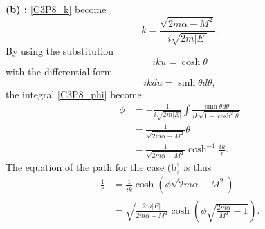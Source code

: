 \begin{problem}
{\vspace{4ex}\textbf{(b) :} \eqref{C3P8_k} become
\begin{equation*}
    k = \frac{\sqrt{2m\alpha-M^2}}{i\sqrt{2m|E|}}.
\end{equation*}
By using the substitution
\begin{equation*}
    iku = \cosh{\theta}
\end{equation*}
with the differential form
\begin{equation*}
    ikdu = \sinh{\theta}d\theta,
\end{equation*}
the integral \eqref{C3P8_phi} become
\begin{align*}
    \phi &= -\frac{1}{i\sqrt{2m|E|}} \int \frac{\sinh{\theta}d\theta}{ik\sqrt{1 - \cosh^2{\theta}}} \\
    &= \frac{1}{\sqrt{2m\alpha-M^2}} \theta \\
    &= \frac{1}{\sqrt{2m\alpha-M^2}} \cosh^{-1}{\frac{ik}{r}}.
\end{align*}
The equation of the path for the case (b) is thus
\begin{align*}
    \frac{1}{r} &= \frac{1}{ik}\cosh{\left(\phi\sqrt{2m\alpha-M^2}\right)} \\
    &= \sqrt{\frac{2m|E|}{2m\alpha-M^2}}\cosh{\left(\phi\sqrt{\frac{2m\alpha}{M^2}-1}\right)}.
\end{align*}

}
\end{problem}
